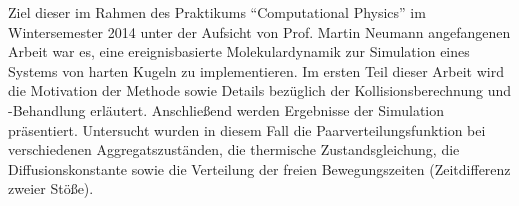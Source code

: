 Ziel dieser im Rahmen des Praktikums ``Computational Physics'' im Wintersemester 2014 unter der Aufsicht von Prof. Martin Neumann angefangenen Arbeit war es, eine ereignisbasierte Molekulardynamik zur Simulation eines Systems von harten Kugeln zu implementieren. Im ersten Teil dieser Arbeit wird die Motivation der Methode sowie Details bezüglich der Kollisionsberechnung und -Behandlung erläutert. Anschließend werden Ergebnisse der Simulation präsentiert. Untersucht wurden in diesem Fall die Paarverteilungsfunktion bei verschiedenen Aggregatszuständen, die thermische Zustandsgleichung, die Diffusionskonstante sowie die Verteilung der freien Bewegungszeiten (Zeitdifferenz zweier Stöße).